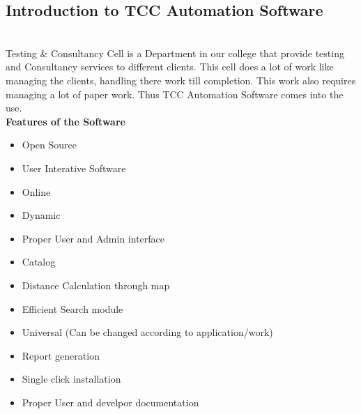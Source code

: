 \subsection{Introduction to TCC Automation Software}\\
Testing \& Consultancy Cell is a Department in our college that provide testing and Consultancy services to different clients. This cell does a lot of work like managing the clients, handling there work till completion. This work also requires managing a lot of paper work. Thus TCC Automation Software comes into the use. \\ 
{\bf Features of the Software}
\begin{itemize}
\item Open Source
\item User Interative Software
\item Online
\item Dynamic
\item Proper User and Admin interface
\item Catalog
\item Distance Calculation through map
\item Efficient Search module
\item Universal (Can be changed according to application/work)
\item Report generation
\item Single click installation
\item Proper User and develpor documentation
\end{itemize}
\newpage
